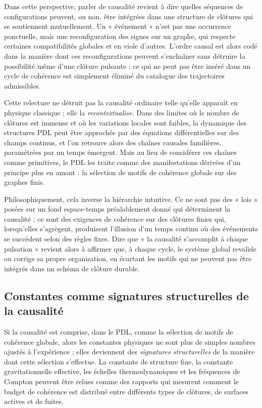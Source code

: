 \documentclass[11pt,a4paper]{article}
\theoremstyle{definition}
\begin{document}
Dans cette perspective, parler de causalité revient à dire quelles séquences de configurations peuvent, ou non, être intégrées dans une structure de clôtures qui se soutiennent mutuellement. Un « événement » n’est pas une occurrence ponctuelle, mais une reconfiguration des signes sur un graphe, qui respecte certaines compatibilités globales et en viole d’autres.\cite{Laubscher_Existence_PulsatingClosure_2026} L’ordre causal est alors codé dans la manière dont ces reconfigurations peuvent s’enchaîner sans détruire la possibilité même d’une clôture pulsante : ce qui ne peut pas être inséré dans un cycle de cohérence est simplement éliminé du catalogue des trajectoires admissibles.

Cette relecture ne détruit pas la causalité ordinaire telle qu’elle apparaît en physique classique ; elle la \emph{recontextualise}. Dans des limites où le nombre de clôtures est immense et où les variations locales sont faibles, la dynamique des structures PDL peut être approchée par des équations différentielles sur des champs continus, et l’on retrouve alors des chaînes causales familières, paramétrées par un temps émergent.\cite{Laubscher_EmergencePhysicalReality_2024,Laubscher_EffectiveFields_2024} Mais au lieu de considérer ces chaînes comme primitives, le PDL les traite comme des manifestations dérivées d’un principe plus en amont : la sélection de motifs de cohérence globale sur des graphes finis.

Philosophiquement, cela inverse la hiérarchie intuitive. Ce ne sont pas des « lois » posées sur un fond espace-temps préalablement donné qui déterminent la causalité ; ce sont des exigences de cohérence sur des clôtures finies qui, lorsqu’elles s’agrègent, produisent l’illusion d’un temps continu où des événements se succèdent selon des règles fixes.\cite{Laubscher_Existence_PulsatingClosure_2026,Laubscher_PDL_Position_2024} Dire que « la causalité s’accomplit à chaque pulsation » revient alors à affirmer que, à chaque cycle, le système global revalide ou corrige sa propre organisation, en écartant les motifs qui ne peuvent pas être intégrés dans un schéma de clôture durable.

\subsection{Constantes comme signatures structurelles de la causalité}

Si la causalité est comprise, dans le PDL, comme la sélection de motifs de cohérence globale, alors les constantes physiques ne sont plus de simples nombres ajustés à l’expérience ; elles deviennent des \emph{signatures structurelles} de la manière dont cette sélection s’effectue.\cite{Laubscher_EmergencePhysicalReality_2024,Laubscher_Alpha_v2_2024} La constante de structure fine, la constante gravitationnelle effective, les échelles thermodynamiques et les fréquences de Compton peuvent être relues comme des rapports qui mesurent comment le budget de cohérence est distribué entre différents types de clôtures, de surfaces actives et de fuites.
\end{document}
